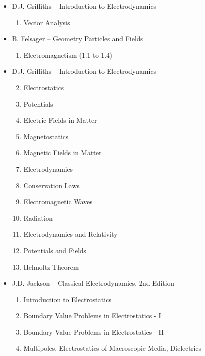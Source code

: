 \begin{itemize}

\item D.J. Griffiths -- Introduction to Electrodynamics
\begin{enumerate}
\setcounter{enumi}{0}
\item Vector Analysis
\end{enumerate}

\item B. Felsager -- Geometry Particles and Fields
\begin{enumerate}
\setcounter{enumi}{0}
\item Electromagnetism (1.1 to 1.4)
\end{enumerate}

\item D.J. Griffiths -- Introduction to Electrodynamics
\begin{enumerate}
\setcounter{enumi}{1}
\item Electrostatics
\item Potentials
\item Electric Fields in Matter
\item Magnetostatics
\item Magnetic Fields in Matter
\item Electrodynamics
\item Conservation Laws
\item Electromagnetic Waves
\item Radiation
\item Electrodynamics and Relativity
\item Potentials and Fields
\item Helmoltz Theorem
\end{enumerate}

\item J.D. Jackson -- Classical Electrodynamics, 2nd Edition
\begin{enumerate}
\setcounter{enumi}{0}
\item Introduction to Electrostatics
\item Boundary Value Problems in Electrostatics - I
\item Boundary Value Problems in Electrostatics - II
\item Multipoles, Electrostatics of Macroscopic Media, Dielectrics
\end{enumerate}


\end{itemize}
